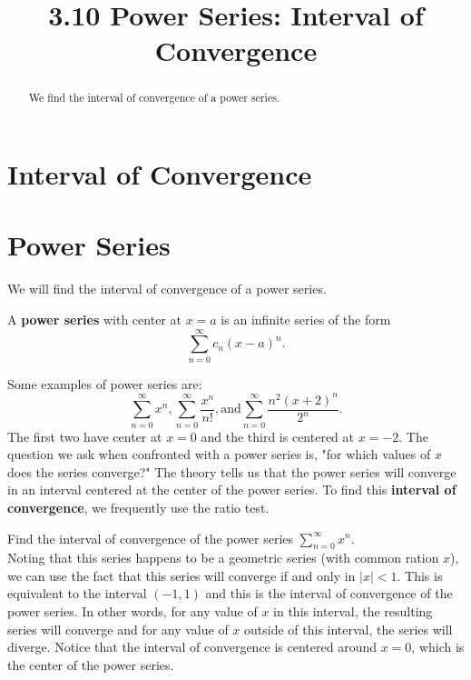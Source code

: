 \documentclass{ximera}
\title{3.10 Power Series: Interval of Convergence}
\begin{document}
\begin{abstract}
We find the interval of convergence of a power series.
\end{abstract}

\maketitle

\section{Interval of Convergence}

\section{Power Series}

We will find the interval of convergence of a power series.

\begin{definition}
A \textbf{power series} with center at $x = a$ is an infinite series of the form
\[
\sum_{n=0}^\infty c_n(x-a)^n.
\]
\end{definition}

Some examples of power series are:
\[ 
\sum_{n=0}^\infty x^n,  \sum_{n=0}^\infty \frac{x^n}{n!}, \text{and} \sum_{n=0}^\infty \frac{n^2(x+ 2)^n}{2^n}.
\]
The first two have center at $x = 0$ and the third is centered at $x = -2$. 
The question we ask when confronted with a power series is, "for which values of $x$ does the series converge?"
The theory tells us that the power series will converge in an interval centered at the center of the power series.
To find this \textbf{interval of convergence}, we frequently use the ratio test.

\begin{example}[example 1]
Find the interval of convergence of the power series $\displaystyle{\sum_{n=0}^\infty x^n}$.\\
Noting that this series happens to be a geometric series (with common ration $x$), we can use the fact that this series will converge 
if and only in $|x| < 1$.  This is equivalent to the interval $(-1, 1)$ and this is the interval of convergence of the power series.
In other words, for any value of $x$ in this interval, 
the resulting series will converge and for any value of $x$ outside of this interval, 
the series will diverge. Notice that the interval of convergence is centered around $x = 0$, which is the center of the power series.
\end{example}
\end{document}
